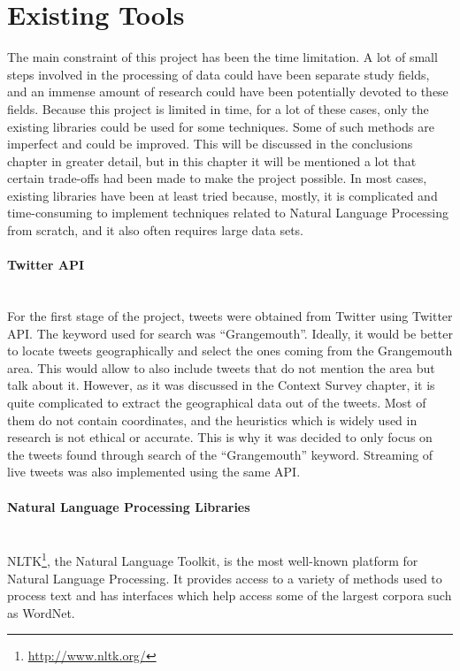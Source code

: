 \section{Existing Tools}
\label{sec:tools}

The main constraint of this project has been the time limitation. A lot of small steps involved in the processing of data could have been separate study fields, and an immense amount of research could have been potentially devoted to these fields. Because this project is limited in time, for a lot of these cases, only the existing libraries could be used for some techniques. Some of such methods are imperfect and could be improved. This will be discussed in the conclusions chapter in greater detail, but in this chapter it will be mentioned a lot that certain trade-offs had been made to make the project possible. In most cases, existing libraries have been at least tried because, mostly, it is complicated and time-consuming to implement techniques related to Natural Language Processing from scratch, and it also often requires large data sets. 

\paragraph{Twitter API}\mbox{}\\
For the first stage of the project, tweets were obtained from Twitter using Twitter API. The keyword used for search was ``Grangemouth''. Ideally, it would be better to locate tweets geographically and select the ones coming from the Grangemouth area. This would allow to also include tweets that do not mention the area but talk about it. However, as it was discussed in the Context Survey chapter, it is quite complicated to extract the geographical data out of the tweets. Most of them do not contain coordinates, and the heuristics which is widely used in research is not ethical or accurate. This is why it was decided to only focus on the tweets found through search of the ``Grangemouth'' keyword. Streaming of live tweets was also implemented using the same API.

\paragraph{Natural Language Processing Libraries}\mbox{}\\
NLTK\footnote{\url{http://www.nltk.org/}}, the Natural Language Toolkit, is the most well-known platform for Natural Language Processing. It provides access to a variety of methods used to process text and has interfaces which help access some of the largest corpora such as WordNet.

